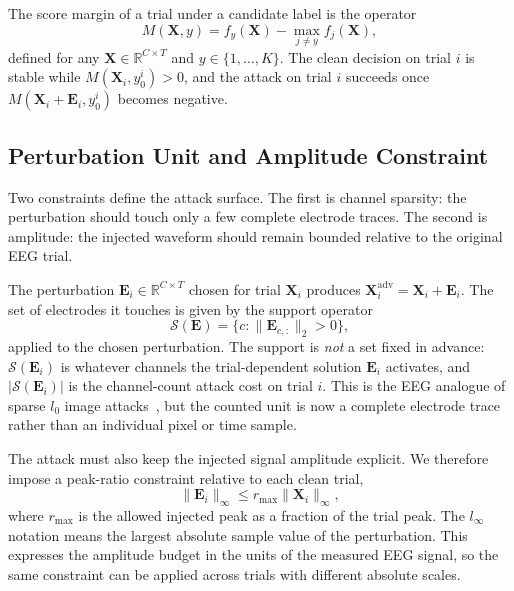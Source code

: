 \documentclass[journal]{IEEEtran}
\begin{document}
The score margin of a trial under a candidate label is the operator
\begin{equation}
M(\mathbf{X},y)=f_{y}(\mathbf{X})-\max_{j\neq y} f_j(\mathbf{X}),
\label{eq:margin}
\end{equation}
defined for any $\mathbf{X}\in\mathbb{R}^{C\times T}$ and $y\in\{1,\ldots,K\}$. The clean decision on trial $i$ is stable while $M(\mathbf{X}_i,y_0^i)>0$, and the attack on trial $i$ succeeds once $M(\mathbf{X}_i+\mathbf{E}_i,y_0^i)$ becomes negative.

\subsection{Perturbation Unit and Amplitude Constraint}

Two constraints define the attack surface. The first is channel sparsity: the perturbation should touch only a few complete electrode traces. The second is amplitude: the injected waveform should remain bounded relative to the original EEG trial.

The perturbation $\mathbf{E}_i\in\mathbb{R}^{C\times T}$ chosen for trial $\mathbf{X}_i$ produces $\mathbf{X}_i^{\mathrm{adv}}=\mathbf{X}_i+\mathbf{E}_i$. The set of electrodes it touches is given by the support operator
\begin{equation}
\mathcal{S}(\mathbf{E})=\{c:\|\mathbf{E}_{c,:}\|_2>0\},
\end{equation}
applied to the chosen perturbation. The support is \emph{not} a set fixed in advance: $\mathcal{S}(\mathbf{E}_i)$ is whatever channels the trial-dependent solution $\mathbf{E}_i$ activates, and $|\mathcal{S}(\mathbf{E}_i)|$ is the channel-count attack cost on trial $i$. This is the EEG analogue of sparse $l_0$ image attacks~\cite{croce2019sparse}, but the counted unit is now a complete electrode trace rather than an individual pixel or time sample.

The attack must also keep the injected signal amplitude explicit. We therefore impose a peak-ratio constraint relative to each clean trial,
\begin{equation}
\|\mathbf{E}_i\|_{\infty}\leq r_{\max}\|\mathbf{X}_i\|_{\infty},
\label{eq:peak_ratio}
\end{equation}
where $r_{\max}$ is the allowed injected peak as a fraction of the trial peak. The $l_\infty$ notation means the largest absolute sample value of the perturbation. This expresses the amplitude budget in the units of the measured EEG signal, so the same constraint can be applied across trials with different absolute scales.
\end{document}
